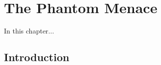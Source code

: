 \chapter{The Phantom Menace}

\graphicspath{{figures/chapter-2/}}


\begin{synopsis}
	In this chapter...
\end{synopsis}


\section{Introduction}

\lipsum[1-4]
\cite{Lorch1969}

